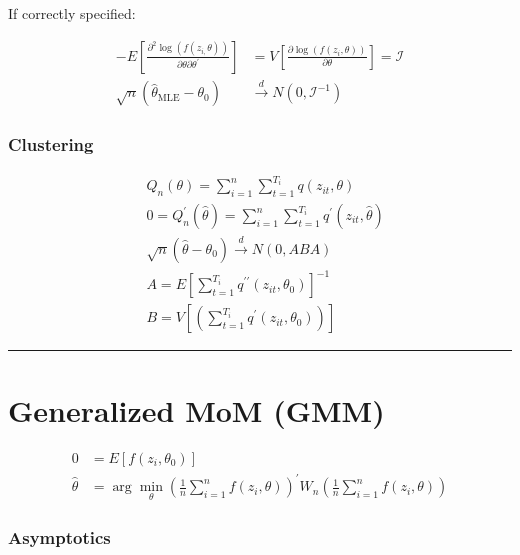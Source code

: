 If correctly specified:

\begin{align*}
    -E\left[\frac{\partial^2 \log \left(f\left(z_{i,} \theta\right)\right)}{\partial \theta \partial \theta^{\prime}}\right] 
    &=V\left[\frac{\partial \log \left(f\left(z_i, \theta\right)\right)}{\partial \theta}\right] = \mathcal{I} \\
    \sqrt{n}\left(\widehat{\theta}_{\mathrm{MLE}}-\theta_0\right) &\stackrel{d}{\longrightarrow} N\left(0, \mathcal{I}^{-1}\right)
\end{align*}

\subsubsection{Clustering}

\begin{align*}
    & Q_n(\theta)=\sum_{i=1}^n \sum_{t=1}^{T_i} q\left(z_{i t}, \theta\right)\\
    & 0=Q_n^{\prime}(\widehat{\theta})=\sum_{i=1}^n \sum_{t=1}^{T_i} q^{\prime}\left(z_{i t}, \widehat{\theta}\right) \\
    & \sqrt{n}\left(\widehat{\theta}-\theta_0\right) \stackrel{d}{\longrightarrow} N\left(0, ABA \right) \\
    & A = E\left[\sum_{t=1}^{T_i} q^{\prime \prime}\left(z_{i t}, \theta_0\right)\right]^{-1} \\
    & B = V\left[\left(\sum_{t=1}^{T_i} q^{\prime}\left(z_{i t}, \theta_0\right)\right)\right]
\end{align*}

\hrule
\section{Generalized MoM (GMM)}

\begin{align*}
    0 &= E\left[f\left(z_i, \theta_0\right)\right] \\
    \widehat{\theta} &= \arg \min _\theta\left(\frac{1}{n} \sum_{i=1}^n f\left(z_i, \theta\right)\right)^{\prime} W_n\left(\frac{1}{n} \sum_{i=1}^n f\left(z_i, \theta\right)\right)
\end{align*}

\subsubsection{Asymptotics}

